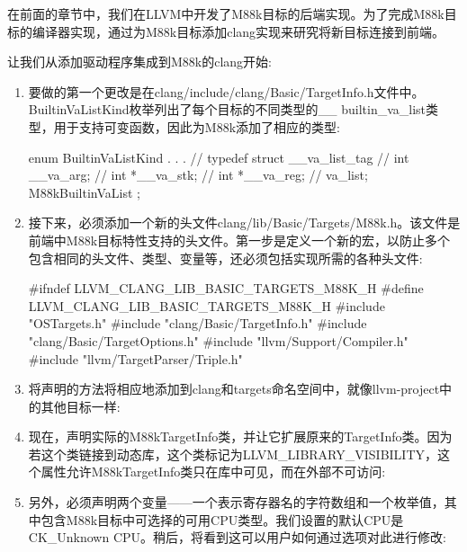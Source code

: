 
在前面的章节中，我们在LLVM中开发了M88k目标的后端实现。为了完成M88k目标的编译器实现，通过为M88k目标添加clang实现来研究将新目标连接到前端。


让我们从添加驱动程序集成到M88k的clang开始:

\begin{enumerate}
\item
要做的第一个更改是在clang/include/clang/Basic/TargetInfo.h文件中。BuiltinVaListKind枚举列出了每个目标的不同类型的\_\_ builtin\_va\_list类型，用于支持可变函数，因此为M88k添加了相应的类型:

\begin{cpp}
enum BuiltinVaListKind {
    . . .
    // typedef struct __va_list_tag {
        // int __va_arg;
        // int *__va_stk;
        // int *__va_reg;
        //} va_list;
    M88kBuiltinVaList
};
\end{cpp}

\item
接下来，必须添加一个新的头文件clang/lib/Basic/Targets/M88k.h。该文件是前端中M88k目标特性支持的头文件。第一步是定义一个新的宏，以防止多个包含相同的头文件、类型、变量等，还必须包括实现所需的各种头文件:

\begin{cpp}
#ifndef LLVM_CLANG_LIB_BASIC_TARGETS_M88K_H
#define LLVM_CLANG_LIB_BASIC_TARGETS_M88K_H
#include "OSTargets.h"
#include "clang/Basic/TargetInfo.h"
#include "clang/Basic/TargetOptions.h"
#include "llvm/Support/Compiler.h"
#include "llvm/TargetParser/Triple.h"
\end{cpp}

\item
将声明的方法将相应地添加到clang和targets命名空间中，就像llvm-project中的其他目标一样:

\begin{cpp}
namespace clang {
namespace targets {
\end{cpp}

\item
现在，声明实际的M88kTargetInfo类，并让它扩展原来的TargetInfo类。因为若这个类链接到动态库，这个类标记为LLVM\_LIBRARY\_VISIBILITY，这个属性允许M88kTargetInfo类只在库中可见，而在外部不可访问:

\begin{cpp}
class LLVM_LIBRARY_VISIBILITY M88kTargetInfo: public TargetInfo
{
\end{cpp}

\item
另外，必须声明两个变量——一个表示寄存器名的字符数组和一个枚举值，其中包含M88k目标中可选择的可用CPU类型。我们设置的默认CPU是CK\_Unknown CPU。稍后，将看到这可以用户如何通过选项对此进行修改:


\end{enumerate}
